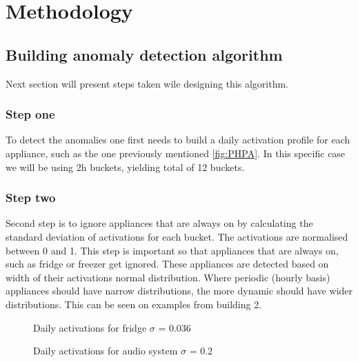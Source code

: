 \section{Methodology}

\subsection{Building anomaly detection algorithm}

Next section will present steps taken wile designing this algorithm.

\subsubsection{Step one}
To detect the anomalies one first needs to build a daily activation profile for each appliance, such as the one previously mentioned \ref{fig:PHPA}.
In this specific case we will be using 2h buckets, yielding total of 12 buckets. 

\subsubsection{Step two}
Second step is to ignore appliances that are always on by calculating the standard deviation of activations for each bucket. 
The activations are normalised between 0 and 1. 
This step is important so that appliances that are always on, such as fridge or freezer get ignored. 
These appliances are detected based on width of their activations normal distribution. 
Where periodic (hourly basis) appliances should have narrow distributions, the more dynamic should have wider distributions.
This can be seen on examples from building 2.

\begin{figure}[H]
    \centering
    \caption{Daily activations for fridge $\sigma$ = 0.036}
    \label{arr:fridge_acts}
\end{figure}

\begin{figure}[H]
    \centering
    \caption{Daily activations for audio system $\sigma$ = 0.2}
    \label{arr:as_acts}
\end{figure}

